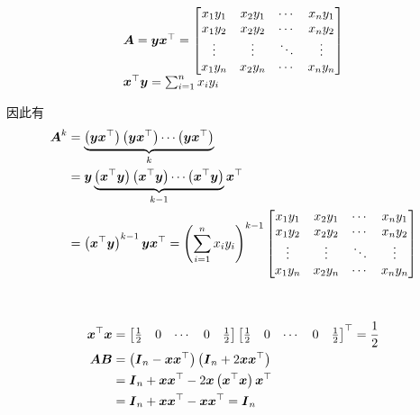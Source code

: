 \documentclass{ctexart}
\begin{document}
\begin{problem}\


\begin{equation*}
    \begin{array}{lll}
        \boldsymbol{A}=\boldsymbol{y}\boldsymbol{x}^\top=
        \begin{bmatrix}
            x_1y_1 & x_2y_1 & \cdots & x_ny_1 \\
            x_1y_2 & x_2y_2 & \cdots & x_ny_2 \\
            \vdots & \vdots & \ddots & \vdots \\
            x_1y_n & x_2y_n & \cdots & x_ny_n \\
        \end{bmatrix}  \\
        \boldsymbol{x}^\top\boldsymbol{y}=\sum_{i=1}^nx_iy_i \\
    \end{array}
\end{equation*}

因此有
\begin{align*}
    \boldsymbol{A}^k & =\underbrace{\left( \boldsymbol{y}\boldsymbol{x}^\top \right)\left( \boldsymbol{y}\boldsymbol{x}^\top \right)\cdots\left( \boldsymbol{y}\boldsymbol{x}^\top \right)}_k                    \\
            & =\boldsymbol{y}\underbrace{\left( \boldsymbol{x}^\top\boldsymbol{y} \right)\left( \boldsymbol{x}^\top\boldsymbol{y} \right)\cdots\left( \boldsymbol{x}^\top\boldsymbol{y} \right)}_{k-1}\boldsymbol{x}^\top \\
            & =\left( \boldsymbol{x}^\top\boldsymbol{y} \right)^{k-1}\boldsymbol{y}\boldsymbol{x}^\top=\left( \sum_{i=1}^nx_iy_i \right)^{k-1}
    \begin{bmatrix}
        x_1y_1 & x_2y_1 & \cdots & x_ny_1 \\
        x_1y_2 & x_2y_2 & \cdots & x_ny_2 \\
        \vdots & \vdots & \ddots & \vdots \\
        x_1y_n & x_2y_n & \cdots & x_ny_n \\
    \end{bmatrix}
\end{align*}

\end{problem}

\begin{problem}\

\begin{align*}
    \boldsymbol{x}^\top\boldsymbol{x} & =
    \begin{bmatrix}
        \frac{1}{2} & 0 & \cdots & 0 & \frac{1}{2}
    \end{bmatrix}
    \begin{bmatrix}
        \frac{1}{2} & 0 & \cdots & 0 & \frac{1}{2}
    \end{bmatrix}^\top=\frac{1}{2}                                         \\
    \boldsymbol{A}\boldsymbol{B}      & =\left( \boldsymbol{I}_n-\boldsymbol{x}\boldsymbol{x}^\top \right)\left( \boldsymbol{I}_n+2\boldsymbol{x}\boldsymbol{x}^\top \right) \\
                    & =\boldsymbol{I}_n+\boldsymbol{x}\boldsymbol{x}^\top-2\boldsymbol{x}\left( \boldsymbol{x}^\top\boldsymbol{x} \right)\boldsymbol{x}^\top \\
                    & =\boldsymbol{I}_n+\boldsymbol{x}\boldsymbol{x}^\top-\boldsymbol{x}\boldsymbol{x}^\top=\boldsymbol{I}_n
\end{align*}

\end{problem}
\end{document}
